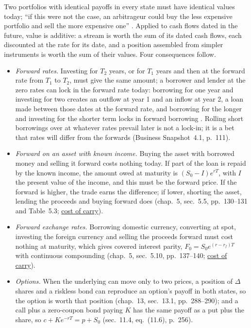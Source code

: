 \begin{qfresult}\label{res:cash-flow-additivity}
 Two portfolios with identical payoffs in every state must have identical values today; ``if this were not the case, an arbitrageur could buy the less expensive portfolio and sell the more expensive one'' \citep[chap.~11, sec.~11.4, p.~255]{s7-hulloptions}. Applied to cash flows dated in the future, value is additive: a stream is worth the sum of its dated cash flows, each discounted at the rate for its date, and a position assembled from simpler instruments is worth the sum of their values. Four consequences follow.

\begin{itemize}
\item \emph{Forward rates.} Investing for $T_2$ years, or for $T_1$ years and then at the forward rate from $T_1$ to $T_2$, must give the same amount; a borrower and lender at the zero rates can lock in the forward rate today: borrowing for one year and investing for two creates an outflow at year 1 and an inflow at year 2, a loan made between those dates at the forward rate, and borrowing for the longer and investing for the shorter term locks in forward borrowing \citep[chap.~4, sec.~4.8, p.~110]{s7-hulloptions}. Rolling short borrowings over at whatever rates prevail later is not a lock-in; it is a bet that rates will differ from the forwards (Business Snapshot~4.1, p.~111).
\item \emph{Forward on an asset with known income.} Buying the asset with borrowed money and selling it forward costs nothing today. If part of the loan is repaid by the known income, the amount owed at maturity is $(S_0-I)e^{rT}$, with $I$ the present value of the income, and this must be the forward price. If the forward is higher, the trade earns the difference; if lower, shorting the asset, lending the proceeds and buying forward does (chap.~5, sec.~5.5, pp.~130--131 and Table~5.3; \hyperref[res:cost-of-carry-forward-price]{cost of carry}).
\item \emph{Forward exchange rates.} Borrowing domestic currency, converting at spot, investing the foreign currency and selling the proceeds forward must cost nothing at maturity, which gives covered interest parity, $F_0=S_0e^{(r-r_f)T}$ with continuous compounding (chap.~5, sec.~5.10, pp.~137--140; \hyperref[res:cost-of-carry-forward-price]{cost of carry}).
\item \emph{Options.} When the underlying can move only to two prices, a position of $\Delta$ shares and a riskless bond can reproduce an option's payoff in both states, so the option is worth that position (chap.~13, sec.~13.1, pp.~288--290); and a call plus a zero-coupon bond paying $K$ has the same payoff as a put plus the share, so $c+Ke^{-rT}=p+S_0$ (sec.~11.4, eq.~(11.6), p.~256).
\end{itemize}


\end{qfresult}
